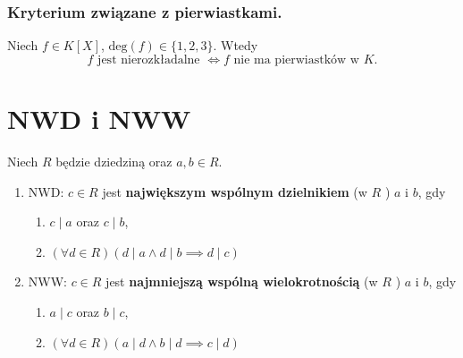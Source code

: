\subsubsection*{Kryterium związane z pierwiastkami.}
Niech $f\in K\left[ X \right] $, $\text{deg}\left( f \right) \in \{1,2,3\} $. Wtedy 
\[
f \text{ jest nierozkładalne } \iff f  \text{ nie ma pierwiastków w } K
.\] 

\section{NWD i NWW}
\begin{definition}
	Niech $R$ będzie dziedziną oraz $a,b \in R$.
	\begin{enumerate}[label=\arabic*)]
		\item NWD: $c\in R$ jest \textbf{największym wspólnym dzielnikiem } (w $R$ ) $a$ i $b$, gdy
			\begin{enumerate}[label=\roman*)]
				\item $c\mid a$ oraz $c\mid b$,
				\item $\left(\forall d\in R \right)\left( d\mid a \land d\mid b \implies d\mid c \right)  $
			\end{enumerate}
		\item NWW: $c\in R$ jest \textbf{najmniejszą wspólną wielokrotnością} (w $R$ ) $a$ i $b$, gdy
			\begin{enumerate}[label=\roman*)]
				\item $a\mid c$ oraz $b\mid c$,
				\item $\left(\forall d\in R \right)\left( a\mid d \land b\mid d \implies c\mid d \right)  $
			\end{enumerate}
	\end{enumerate}
\end{definition} 

